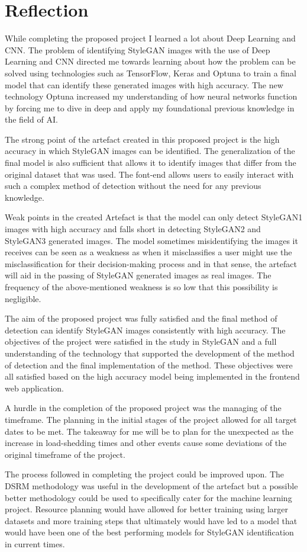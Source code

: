 \chapter{Reflection}

While completing the proposed project I learned a lot about Deep Learning and CNN. The problem of identifying StyleGAN images with the use of Deep Learning and CNN directed me towards learning about how the problem can be solved using technologies such as TensorFlow, Keras and Optuna to train a final model that can identify these generated images with high accuracy. The new technology Optuna increased my understanding of how neural networks function by forcing me to dive in deep and apply my foundational previous knowledge in the field of AI.

The strong point of the artefact created in this proposed project is the high accuracy in which StyleGAN images can be identified. The generalization of the final model is also sufficient that allows it to identify images that differ from the original dataset that was used. The font-end allows users to easily interact with such a complex method of detection without the need for any previous knowledge.

Weak points in the created Artefact is that the model can only detect StyleGAN1 images with high accuracy and falls short in detecting StyleGAN2 and StyleGAN3 generated images. The model sometimes misidentifying the images it receives can be seen as a weakness as when it misclassifies a user might use the misclassification for their decision-making process and in that sense, the artefact will aid in the passing of StyleGAN generated images as real images. The frequency of the above-mentioned weakness is so low that this possibility is negligible.

The aim of the proposed project was fully satisfied and the final method of detection can identify StyleGAN images consistently with high accuracy. The objectives of the project were satisfied in the study in StyleGAN and a full understanding of the technology that supported the development of the method of detection and the final implementation of the method. These objectives were all satisfied based on the high accuracy model being implemented in the frontend web application.

A  hurdle in the completion of the proposed project was the managing of the timeframe. The planning in the initial stages of the project allowed for all target dates to be met. The takeaway for me will be to plan for the unexpected as the increase in load-shedding times and other events cause some deviations of the original timeframe of the project.

The process followed in completing the project could be improved upon. The DSRM methodology was useful in the development of the artefact but a possible better methodology could be used to specifically cater for the machine learning project. Resource planning would have allowed for better training using larger datasets and more training steps that ultimately would have led to a model that would have been one of the best performing models for StyleGAN identification in current times. 